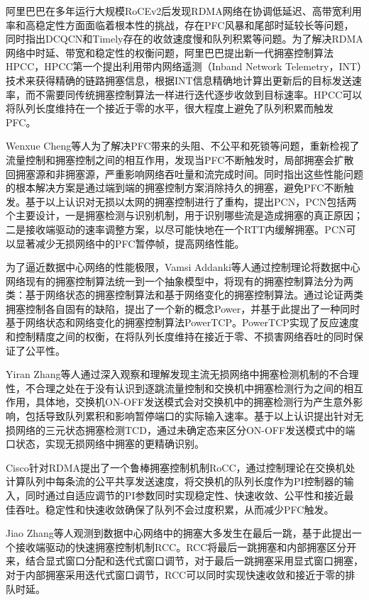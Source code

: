 阿里巴巴在多年运行大规模RoCEv2后发现RDMA网络在协调低延迟、高带宽利用率和高稳定性方面面临着根本性的挑战，存在PFC风暴和尾部时延较长等问题，同时指出DCQCN和Timely存在的收敛速度慢和队列积累等问题。为了解决RDMA网络中时延、带宽和稳定性的权衡问题，阿里巴巴提出新一代拥塞控制算法HPCC\cite{SIGCOMM19HPCC}，HPCC第一个提出利用带内网络遥测（Inband Network Telemetry，INT）技术来获得精确的链路拥塞信息，根据INT信息精确地计算出更新后的目标发送速率，而不需要同传统拥塞控制算法一样进行迭代逐步收敛到目标速率。HPCC可以将队列长度维持在一个接近于零的水平，很大程度上避免了队列积累而触发PFC。

Wenxue Cheng等人为了解决PFC带来的头阻、不公平和死锁等问题，重新检视了流量控制和拥塞控制之间的相互作用，发现当PFC不断触发时，局部拥塞会扩散回拥塞源和非拥塞源，严重影响网络吞吐量和流完成时间。同时指出这些性能问题的根本解决方案是通过端到端的拥塞控制方案消除持久的拥塞，避免PFC不断触发。基于以上认识对无损以太网的拥塞控制进行了重构，提出PCN\cite{NSDI20PCN}，PCN包括两个主要设计，一是拥塞检测与识别机制，用于识别哪些流是造成拥塞的真正原因；二是接收端驱动的速率调整方案，以尽可能快地在一个RTT内缓解拥塞。PCN可以显著减少无损网络中的PFC暂停帧，提高网络性能。

为了逼近数据中心网络的性能极限，Vamsi Addanki等人通过控制理论将数据中心网络现有的拥塞控制算法统一到一个抽象模型中，将现有的拥塞控制算法分为两类：基于网络状态的拥塞控制算法和基于网络变化的拥塞控制算法。通过论证两类拥塞控制各自固有的缺陷，提出了一个新的概念Power，并基于此提出了一种同时基于网络状态和网络变化的拥塞控制算法PowerTCP\cite{NSDI22PowerTCP}。PowerTCP实现了反应速度和控制精度之间的权衡，在将队列长度维持在接近于零、不损害网络吞吐的同时保证了公平性。

Yiran Zhang等人通过深入观察和理解发现主流无损网络中拥塞检测机制的不合理性，不合理之处在于没有认识到逐跳流量控制和交换机中拥塞检测行为之间的相互作用，具体地，交换机ON-OFF发送模式会对交换机中的拥塞检测行为产生意外影响，包括导致队列累积和影响暂停端口的实际输入速率。基于以上认识提出针对无损网络的三元状态拥塞检测TCD\cite{SIGCOMM21TCD}，通过未确定态来区分ON-OFF发送模式中的端口状态，实现无损网络中拥塞的更精确识别。

Cisco针对RDMA提出了一个鲁棒拥塞控制机制RoCC\cite{CoNEXT20RoCC}，通过控制理论在交换机处计算队列中每条流的公平共享发送速度，将交换机的队列长度作为PI控制器的输入，同时通过自适应调节的PI参数同时实现稳定性、快速收敛、公平性和接近最佳吞吐。稳定性和快速收敛确保了队列不会过度积累，从而减少PFC触发。

Jiao Zhang等人观测到数据中心网络中的拥塞大多发生在最后一跳，基于此提出一个接收端驱动的快速拥塞控制机制RCC\cite{ICNP21RCC}。RCC将最后一跳拥塞和内部拥塞区分开来，结合显式窗口分配和迭代式窗口调节，对于最后一跳拥塞采用显式窗口拥塞，对于内部拥塞采用迭代式窗口调节，RCC可以同时实现快速收敛和接近于零的排队时延。

